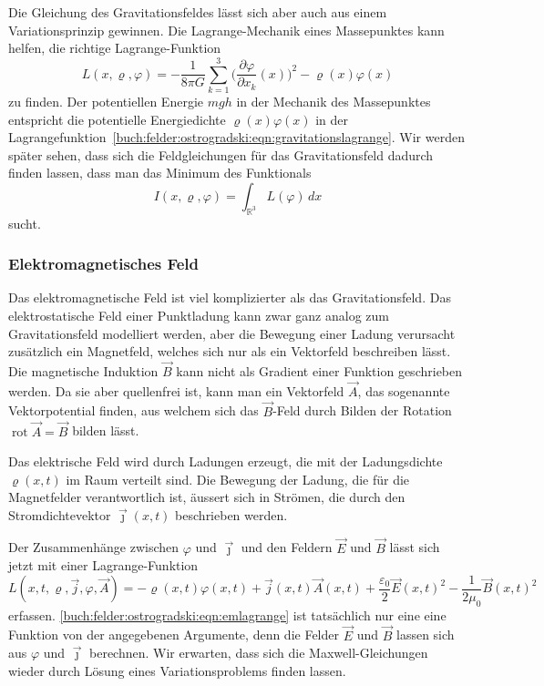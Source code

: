 Die Gleichung des Gravitationsfeldes lässt sich aber auch aus einem
Variationsprinzip gewinnen.
Die Lagrange-Mechanik eines Massepunktes kann helfen, die richtige
Lagrange-Funktion
\begin{equation}
L(x,\varrho,\varphi)
=
-\frac{1}{8\pi G}
\sum_{k=1}^3
\biggl(
\frac{\partial \varphi}{\partial x_k}(x)
\biggr)^2
-
\varrho(x)\varphi(x)
\label{buch:felder:ostrogradski:eqn:gravitationslagrange}
\end{equation}
zu finden.
Der potentiellen Energie $mgh$ in der Mechanik des Massepunktes
entspricht die potentielle Energiedichte $\varrho(x)\varphi(x)$
in der
Lagrangefunktion~\eqref{buch:felder:ostrogradski:eqn:gravitationslagrange}.
Wir werden später sehen, dass sich die Feldgleichungen für das
Gravitationsfeld dadurch finden lassen, dass man das Minimum des
Funktionals
\[
I(x,\varrho,\varphi)
=
\int_{\mathbb{R}^3} L(\varphi)
\,dx
\]
sucht.

%
%
\subsubsection{Elektromagnetisches Feld}
Das elektromagnetische Feld ist viel komplizierter als das Gravitationsfeld.
Das elektrostatische Feld einer Punktladung kann zwar ganz analog zum
Gravitationsfeld modelliert werden, aber die Bewegung einer Ladung
verursacht zusätzlich ein Magnetfeld, welches sich nur als ein
Vektorfeld beschreiben lässt.
Die magnetische Induktion $\vec{B}$ kann nicht als Gradient einer Funktion
geschrieben werden.
Da sie aber quellenfrei ist, kann man ein Vektorfeld $\vec{A}$,
das sogenannte Vektorpotential finden, aus welchem sich das $\vec{B}$-Feld
durch Bilden der Rotation $\operatorname{rot}\vec{A}=\vec{B}$ bilden
lässt.

Das elektrische Feld wird durch Ladungen erzeugt, die mit der
Ladungsdichte $\varrho(x,t)$ im Raum verteilt sind.
Die Bewegung der Ladung, die für die Magnetfelder verantwortlich ist,
äussert sich in Strömen, die durch den Stromdichtevektor $\vec{\jmath}(x,t)$
beschrieben werden.

Der Zusammenhänge zwischen $\varphi$ und $\vec{\jmath}$ und den Feldern
$\vec{E}$ und $\vec{B}$ lässt sich jetzt mit einer Lagrange-Funktion
\begin{equation}
L(x,t,\varrho,\vec{j},\varphi,\vec{A})
=
-\varrho(x,t) \varphi(x,t)
+
\vec{j}(x,t)\vec{A}(x,t)
+
\frac{\varepsilon_0}{2}\vec{E}(x,t)^2
-
\frac{1}{2\mu_0}\vec{B}(x,t)^2
\label{buch:felder:ostrogradski:eqn:emlagrange}
\end{equation}
erfassen.
\eqref{buch:felder:ostrogradski:eqn:emlagrange} ist tatsächlich nur
eine eine Funktion von der angegebenen Argumente, denn die Felder
$\vec{E}$ und $\vec{B}$ lassen sich aus $\varphi$ und $\vec{\jmath}$ 
berechnen.
Wir erwarten, dass sich die Maxwell-Gleichungen wieder durch
Lösung eines Variationsproblems finden lassen.

